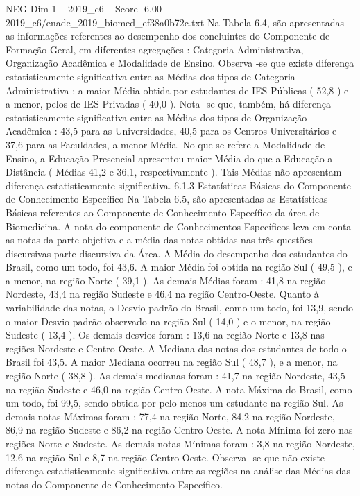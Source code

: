 \begin{textsample}{NEG Dim 1 – 2019\_c6 – Score -6.00 – 2019\_c6/enade\_2019\_biomed\_ef38a0b72c.txt}
Na Tabela 6.4, são apresentadas as informações referentes ao desempenho dos concluintes do Componente de Formação Geral, em diferentes agregações : Categoria Administrativa, Organização Acadêmica e Modalidade de Ensino.
Observa -se que existe diferença estatisticamente significativa entre as Médias dos tipos de Categoria Administrativa : a maior Média obtida por estudantes de IES Públicas ( 52,8 ) e a menor, pelos de IES Privadas ( 40,0 ).
Nota -se que, também, há diferença estatisticamente significativa entre as Médias dos tipos de Organização Acadêmica : 43,5 para as Universidades, 40,5 para os Centros Universitários e 37,6 para as Faculdades, a menor Média.
No que se refere a Modalidade de Ensino, a Educação Presencial apresentou maior Média do que a Educação a Distância ( Médias 41,2 e 36,1, respectivamente ).
Tais Médias não apresentam diferença estatisticamente significativa. 6.1.3 Estatísticas Básicas do Componente de Conhecimento Específico Na Tabela 6.5, são apresentadas as Estatísticas Básicas referentes ao Componente de Conhecimento Específico da área de Biomedicina.
A nota do componente de Conhecimentos Específicos leva em conta as notas da parte objetiva e a média das notas obtidas nas três questões discursivas parte discursiva da Área.
A Média do desempenho dos estudantes do Brasil, como um todo, foi 43,6.
A maior Média foi obtida na região Sul ( 49,5 ), e a menor, na região Norte ( 39,1 ).
As demais Médias foram : 41,8 na região Nordeste, 43,4 na região Sudeste e 46,4 na região Centro-Oeste.
Quanto à variabilidade das notas, o Desvio padrão do Brasil, como um todo, foi 13,9, sendo o maior Desvio padrão observado na região Sul ( 14,0 ) e o menor, na região Sudeste ( 13,4 ).
Os demais desvios foram : 13,6 na região Norte e 13,8 nas regiões Nordeste e Centro-Oeste.
A Mediana das notas dos estudantes de todo o Brasil foi 43,5.
A maior Mediana ocorreu na região Sul ( 48,7 ), e a menor, na região Norte ( 38,8 ).
As demais medianas foram : 41,7 na região Nordeste, 43,5 na região Sudeste e 46,0 na região Centro-Oeste.
A nota Máxima do Brasil, como um todo, foi 99,5, sendo obtida por pelo menos um estudante na região Sul.
As demais notas Máximas foram : 77,4 na região Norte, 84,2 na região Nordeste, 86,9 na região Sudeste e 86,2 na região Centro-Oeste.
A nota Mínima foi zero nas regiões Norte e Sudeste.
As demais notas Mínimas foram : 3,8 na região Nordeste, 12,6 na região Sul e 8,7 na região Centro-Oeste.
Observa -se que não existe diferença estatisticamente significativa entre as regiões na análise das Médias das notas do Componente de Conhecimento Específico.

\end{textsample}

